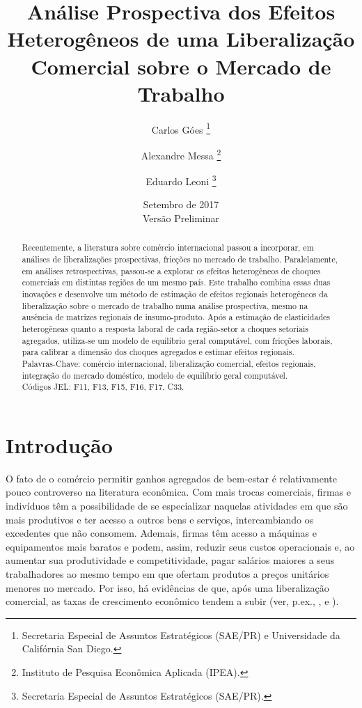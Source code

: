 \documentclass{article}
\title{Análise Prospectiva dos Efeitos Heterogêneos de uma Liberalização Comercial sobre o Mercado de Trabalho}
\author{Carlos Góes \thanks{Secretaria Especial de Assuntos Estratégicos (SAE/PR) e Universidade da Califórnia \textemdash San Diego.} \and Alexandre Messa \thanks{Instituto de Pesquisa Econômica Aplicada (IPEA).} \and Eduardo Leoni \thanks{Secretaria Especial de Assuntos Estratégicos (SAE/PR).}}
\date{Setembro de 2017 \\ Versão Preliminar}
\begin{document}
\maketitle

\begin{abstract}
Recentemente, a literatura sobre comércio internacional passou a incorporar, em análises de liberalizações prospectivas, fricções no mercado de trabalho. Paralelamente, em  análises retrospectivas, passou-se a explorar os efeitos heterogêneos de choques comerciais em distintas regiões de um mesmo país. Este trabalho combina essas duas inovações e desenvolve um método de estimação de efeitos regionais heterogêneos da liberalização sobre o mercado de trabalho numa análise prospectiva, mesmo na ausência de matrizes regionais de insumo-produto. Após a estimação de elasticidades heterogêneas quanto a resposta laboral de cada região-setor a choques setoriais agregados, utiliza-se um modelo de equilíbrio geral computável, com fricções laborais, para calibrar a dimensão dos choques agregados e estimar efeitos regionais. \\
Palavras-Chave: comércio internacional, liberalização comercial, efeitos regionais, integração do mercado doméstico, modelo de equilíbrio geral computável. \\
Códigos JEL: F11, F13, F15, F16, F17, C33.
\end{abstract}

\newpage

\renewcommand{\cftsecleader}{\cftdotfill{\cftdotsep}}
\tableofcontents
{}


\newpage

\listoffigures
{}

\newpage


\section{Introdução}

O fato de o comércio permitir ganhos agregados de bem-estar é relativamente pouco controverso na literatura econômica. Com mais trocas comerciais, firmas e indivíduos têm a possibilidade de se especializar naquelas atividades em que são mais produtivos e ter acesso a outros bens e serviços, intercambiando os excedentes que não consomem. Ademais, firmas têm acesso a máquinas e equipamentos mais baratos e podem, assim, reduzir seus custos operacionais e, ao aumentar sua produtividade e competitividade, pagar salários maiores a seus trabalhadores ao mesmo tempo em que ofertam produtos a preços unitários menores no mercado. Por isso, há evidências de que, após uma liberalização comercial, as taxas de crescimento econômico tendem a subir (ver, p.ex., \textcite{wacziarg}, \textcite{frankelromer} e \textcite{edwards}). 
\end{document}
